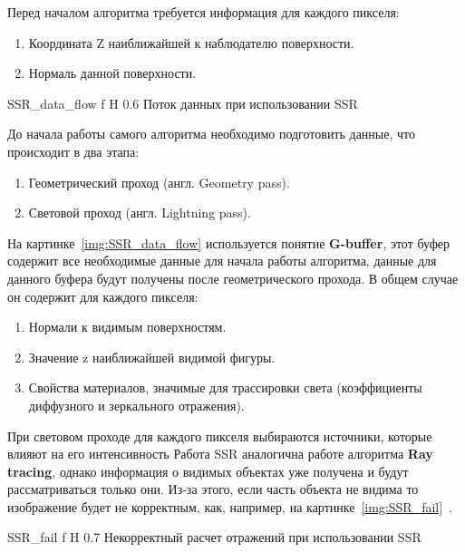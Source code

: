 Перед началом алгоритма требуется информация для каждого пикселя:
\begin{enumerate}
	\item Координата Z наиближайшей к наблюдателю поверхности.
	\item Нормаль данной поверхности.
\end{enumerate}



{SSR_data_flow} %
{f} %
{H} %
{0.6\textwidth} %
{Поток данных при использовании SSR} %



До начала работы самого алгоритма необходимо подготовить данные, что происходит в два этапа:
\begin{enumerate}
	\item Геометрический проход (англ. Geometry pass).
	\item Световой проход (англ. Lightning pass).
\end{enumerate}

На картинке~\ref{img:SSR_data_flow} используется понятие \textbf{G-buffer}, этот буфер содержит все необходимые данные для начала работы алгоритма, данные для данного буфера
будут получены после геометрического прохода. В общем случае он содержит для каждого пикселя:
\begin{enumerate}
	\item Нормали к видимым поверхностям.
	\item Значение z наиближайшей видимой фигуры.
	\item Свойства материалов, значимые для трассировки света (коэффициенты диффузного и зеркального отражения).
\end{enumerate}
При световом проходе для каждого пикселя выбираются источники, которые влияют на его интенсивность
Работа SSR аналогична работе алгоритма \textbf{Ray tracing}, однако информация о видимых объектах уже получена и будут рассматриваться только они.
Из-за этого, если часть объекта не видима то изображение будет не корректным, как, например, на картинке~\ref{img:SSR_fail}~\cite{SSR,reflexion_types}.


{SSR_fail} %
{f} %
{H} %
{0.7\textwidth} %
{Некорректный расчет отражений при использовании SSR} %




